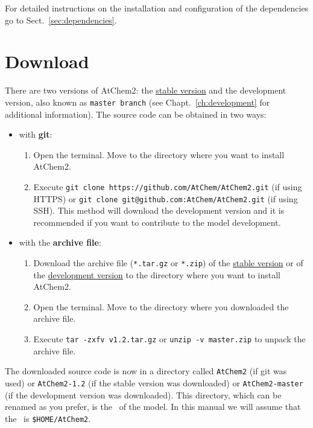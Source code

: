 For detailed instructions on the installation and configuration of the
dependencies go to Sect.~\ref{sec:dependencies}.

\section{Download} \label{sec:download}

There are two versions of AtChem2: the
\href{https://github.com/AtChem/AtChem2/releases}{stable version} and
the development version, also known as \texttt{master\ branch} (see
Chapt.~\ref{ch:development} for additional information). The source
code can be obtained in two ways:

\begin{itemize}
\item with \textbf{git}:
  \begin{enumerate}
  \item Open the terminal. Move to the directory where you want to
    install AtChem2.
  \item Execute \verb|git clone https://github.com/AtChem/AtChem2.git|
    (if using HTTPS) or \verb|git clone git@github.com:AtChem/AtChem2.git|
    (if using SSH). This method will download the development version
    and it is recommended if you want to contribute to the model
    development.
  \end{enumerate}
\item with the \textbf{archive file}:
  \begin{enumerate}
  \item Download the archive file (\texttt{*.tar.gz} or \texttt{*.zip}) of the
    \href{https://github.com/AtChem/AtChem2/releases}{stable version} or of the
    \href{https://github.com/AtChem/AtChem2/archive/master.zip}{development version}
    to the directory where you want to install AtChem2.
  \item Open the terminal. Move to the directory where you downloaded
    the archive file.
  \item Execute \verb|tar -zxfv v1.2.tar.gz| or
    \verb|unzip -v master.zip| to unpack the archive file.
  \end{enumerate}
\end{itemize}

The downloaded source code is now in a directory called
\texttt{AtChem2} (if git was used) or \texttt{AtChem2-1.2} (if the
stable version was downloaded) or \texttt{AtChem2-master} (if the
development version was downloaded). This directory, which can be
renamed as you prefer, is the \maindir\ of the model. In this manual
we will assume that the \maindir\ is \texttt{\$HOME/AtChem2}.

